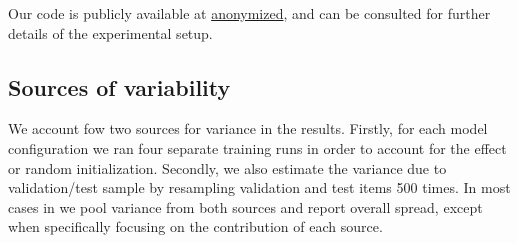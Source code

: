 Our code is publicly available at \url{anonymized},
and can be consulted for further details of the experimental setup.



\subsection{Sources of variability}
\label{sec:variability}
We account fow two sources for variance in the results. Firstly, for
each model configuration we ran four separate training runs in order
to account for the effect or random initialization. Secondly, we also
estimate the variance due to  validation/test sample by 
resampling validation and test items 500 times. In most cases in
 we pool variance from both sources and report
overall spread, except when specifically focusing on the contribution
of each source.
